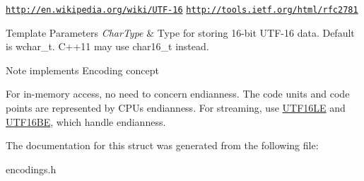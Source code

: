 \href{http://en.wikipedia.org/wiki/UTF-16}{\tt http\+://en.\+wikipedia.\+org/wiki/\+U\+T\+F-\/16} \href{http://tools.ietf.org/html/rfc2781}{\tt http\+://tools.\+ietf.\+org/html/rfc2781} 
\begin{DoxyTemplParams}{Template Parameters}
{\em Char\+Type} & Type for storing 16-\/bit U\+T\+F-\/16 data. Default is wchar\+\_\+t. C++11 may use char16\+\_\+t instead. \\
\hline
\end{DoxyTemplParams}
\begin{DoxyNote}{Note}
implements Encoding concept

For in-\/memory access, no need to concern endianness. The code units and code points are represented by C\+PU\textquotesingle{}s endianness. For streaming, use \hyperlink{a00329}{U\+T\+F16\+LE} and \hyperlink{a00328}{U\+T\+F16\+BE}, which handle endianness. 
\end{DoxyNote}


The documentation for this struct was generated from the following file\+:\begin{DoxyCompactItemize}
\item 
encodings.\+h\end{DoxyCompactItemize}
